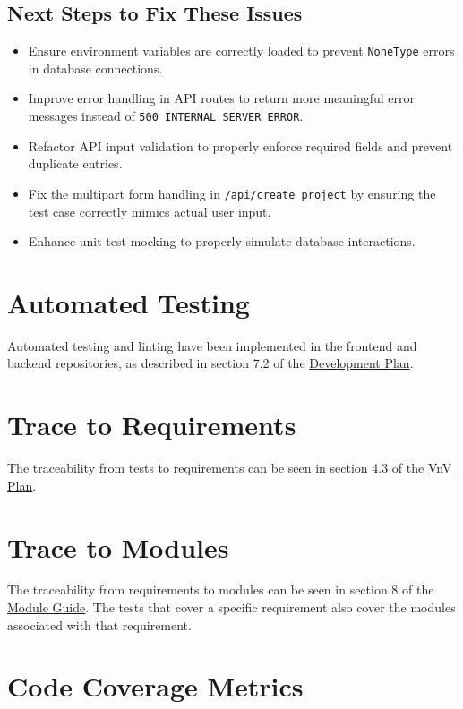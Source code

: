 \documentclass[12pt, titlepage]{article}
\begin{document}
\subsection{Next Steps to Fix These Issues}
\begin{itemize}
    \item Ensure environment variables are correctly loaded to prevent \texttt{NoneType} errors in database connections.
    \item Improve error handling in API routes to return more meaningful error messages instead of \texttt{500 INTERNAL SERVER ERROR}.
    \item Refactor API input validation to properly enforce required fields and prevent duplicate entries.
    \item Fix the multipart form handling in \texttt{/api/create\_project} by ensuring the test case correctly mimics actual user input.
    \item Enhance unit test mocking to properly simulate database interactions.
\end{itemize}

\section{Automated Testing}
Automated testing and linting have been implemented in the frontend and backend repositories, as described in section 7.2 of the \href{https://github.com/OKKM-insights/OKKM.insights/blob/main/docs/DevelopmentPlan/DevelopmentPlan.pdf}{Development Plan}.

		
\section{Trace to Requirements}
The traceability from tests to requirements can be seen in section 4.3 of the \href{https://github.com/OKKM-insights/OKKM.insights/blob/main/docs/VnVPlan/VnVPlan.pdf}{VnV Plan}.
		
\section{Trace to Modules}
The traceability from requirements to modules can be seen in section 8 of the \href{https://github.com/OKKM-insights/OKKM.insights/blob/main/docs/Design/SoftArchitecture/MG.pdf}{Module Guide}. The tests that cover a specific requirement also cover the modules associated with that requirement.	

\section{Code Coverage Metrics}
\end{document}
